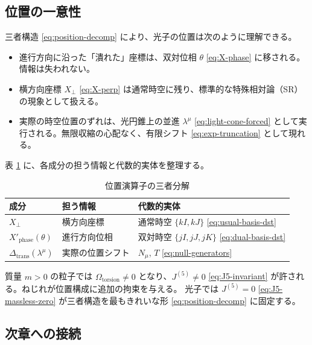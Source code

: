 \documentclass[dvipdfmx,a4paper,oneside]{jsbook}
\numberwithin{equation}{chapter}
\begin{document}
\subsection{位置の一意性}

三者構造 \eqref{eq:position-decomp} により、光子の位置は次のように理解できる。

\begin{itemize}[leftmargin=2em]
  \item 進行方向に沿った「潰れた」座標は、双対位相 \(\theta\) \eqref{eq:X-phase} に移される。情報は失われない。
  \item 横方向座標 \(X_\perp\) \eqref{eq:X-perp} は通常時空に残り、標準的な特殊相対論（SR）の現象として扱える。
  \item 実際の時空位置のずれは、光円錐上の並進 \(\lambda^\mu\) \eqref{eq:light-cone-forced} として実行される。無限収縮の心配なく、有限シフト \eqref{eq:exp-truncation} として現れる。
\end{itemize}

表 \ref{tab:position-components} に、各成分の担う情報と代数的実体を整理する。

\begin{table}[htbp]
  \centering
  \caption{位置演算子の三者分解}
  \label{tab:position-components}
  \begin{tabular}{@{}lll@{}}
    \toprule
    成分 & 担う情報 & 代数的実体 \\
    \midrule
    \(X_\perp\) & 横方向座標 & 通常時空 \(\{kI, kJ\}\) \eqref{eq:usual-basis-dst} \\
    \(X'_{\mathrm{phase}}(\theta)\) & 進行方向位相 & 双対時空 \(\{jI, jJ, jK\}\) \eqref{eq:dual-basis-dst} \\
    \(\Delta_{\mathrm{trans}}(\lambda^\mu)\) & 実際の位置シフト & \(N_\mu\), \(T\) \eqref{eq:null-generators} \\
    \bottomrule
  \end{tabular}
\end{table}

質量 \(m > 0\) の粒子では \(\Omega_{\mathrm{torsion}} \neq 0\) となり、\(J^{(5)} \neq 0\) \eqref{eq:J5-invariant} が許される。ねじれが位置構成に追加の拘束を与える。
光子では \(J^{(5)} = 0\) \eqref{eq:J5-massless-zero} が三者構造を最もきれいな形 \eqref{eq:position-decomp} に固定する。

\subsection{次章への接続}
\end{document}
